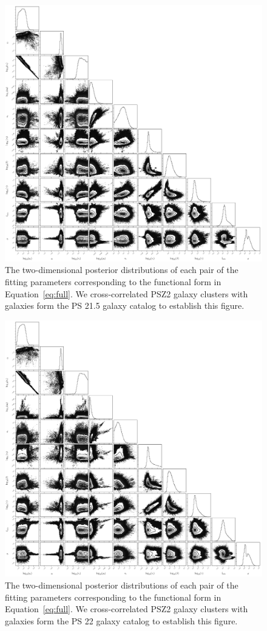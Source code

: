 \documentclass[iop, apjl, twocolappendix, numberedappendix]{emulateapj}
\begin{document}
\begin{figure}
    \includegraphics[width= \textwidth]{corner215.pdf}
\caption{The two-dimensional posterior distributions of each pair of
the fitting parameters corresponding to the functional
form in Equation~\ref{eq:full}. We cross-correlated PSZ2 galaxy clusters with
galaxies form the PS 21.5 galaxy catalog to establish this figure.}
   \label{fig:corner_21.5} 
\end{figure}
\begin{figure}
    \includegraphics[width= \textwidth]{corner22.pdf}
\caption{The two-dimensional posterior distributions of each pair of
the fitting parameters corresponding to the functional
form in Equation~\ref{eq:full}. We cross-correlated PSZ2 galaxy clusters with
galaxies form the PS 22 galaxy catalog to establish this figure.}
   \label{fig:corner_22} 
\end{figure}
\end{document}
